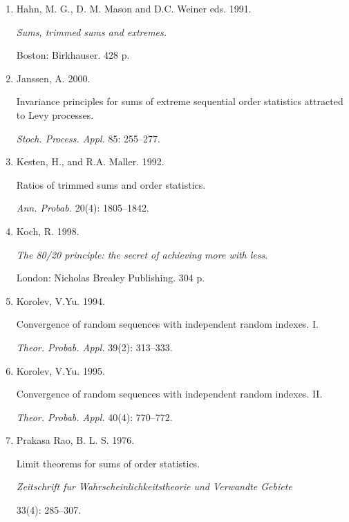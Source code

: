 \documentclass[14pt,a4paper]{extarticle}
\begin{document}
\begin{enumerate}
Varna. 5--37.



\item

Hahn, M. G., D. M. Mason and D.C. Weiner eds. 1991.

{\it Sums, trimmed sums and extremes.}

Boston: Birkhauser. 428 p.



\item

Janssen, A. 2000.

Invariance principles for sums of extreme sequential order statistics attracted to Levy processes.

{\it Stoch. Process. Appl.} 85: 255--277.



\item

Kesten, H., and R.A. Maller. 1992.

Ratios of trimmed sums and order statistics.

{\it Ann. Probab.} 20(4): 1805--1842.



\item

Koch, R. 1998.

{\it The 80/20 principle: the secret of achieving more with less}. 

London: Nicholas Brealey Publishing. 304 p. 



\item

Korolev, V.Yu. 1994.

Convergence of random sequences with independent random indexes. I.

{\it Theor. Probab. Appl.} 39(2): 313--333.



\item

Korolev, V.Yu. 1995.

Convergence of random sequences with independent random indexes. II.

{\it Theor. Probab. Appl.} 40(4): 770--772.



\item

Prakasa Rao, B. L. S. 1976.

Limit theorems for sums of order statistics.

{\it Zeitschrift fur Wahrscheinlichkeitstheorie und Verwandte Gebiete}

33(4): 285--307.





\end{enumerate}
\end{document}
